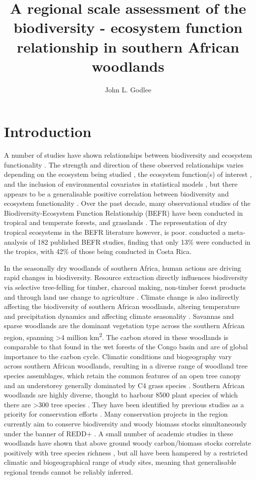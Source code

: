 \documentclass[11pt,a4paper]{article}
\title{A regional scale assessment of the biodiversity - ecosystem function relationship in southern African woodlands}
\author{John L. Godlee}
\date{}
\begin{document}
\maketitle
\tableofcontents

\section{Introduction}

A number of studies have shown relationships between biodiversity and ecosystem functionality \citep{Review}. The strength and direction of these observed relationships varies depending on the ecosystem being studied \citep{}, the ecosystem function(s) of interest \citep{}, and the inclusion of environmental covariates in statistical models \citep{}, but there appears to be a generalisable positive correlation between biodiversity and ecosystem functionality \citep{}. Over the past decade, many observational studies of the Biodiversity-Ecosystem Function Relationship (BEFR) have been conducted in tropical and temperate forests, and grasslands \citep{Chen2011}. The representation of dry tropical ecosystems in the BEFR literature however, is poor. \citet{Clarke2017} conducted a meta-analysis of 182 published BEFR studies, finding that only 13\% were conducted in the tropics, with 42\% of those being conducted in Costa Rica.

In the seasonally dry woodlands of southern Africa, human actions are driving rapid changes in biodiversity. Resource extraction directly influences biodiversity via selective tree-felling for timber, charcoal making, non-timber forest products and through land use change to agriculture \citep{Ryan2016}. Climate change is also indirectly affecting the biodiversity of southern African woodlands, altering temperature and precipitation dynamics and affecting climate seasonality \citep{}. Savannas and sparse woodlands are the dominant vegetation type across the southern African region, spanning \textgreater{}4 million km\textsuperscript{2}. The carbon stored in these woodlands is comparable to that found in the wet forests of the Congo basin and are of global importance to the carbon cycle. Climatic conditions and biogeography vary across southern African woodlands, resulting in a diverse range of woodland tree species assemblages, which retain the common features of an open tree canopy and an understorey generally dominated by C4 grass species \citep{Frost1996}. Southern African woodlands are highly diverse, thought to harbour \textapprox{}8500 plant species of which there are \textgreater{}300 tree species \citep{Frost1996}. They have been identified by previous studies as a priority for conservation efforts \citep{Brooks2006, Mittermeier2003, Frost1996}. Many conservation projects in the region currently aim to conserve biodiversity and woody biomass stocks simultaneously under the banner of REDD+ \citep{Hinsley2015}. A small number of academic studies in these woodlands have shown that above ground woody carbon/biomass stocks correlate positively with tree species richness \citep{McNicol2017, and, others}, but all have been hampered by a restricted climatic and biogeographical range of study sites, meaning that generalisable regional trends cannot be reliably inferred. \citet{Fayolle2018} 
\end{document}
